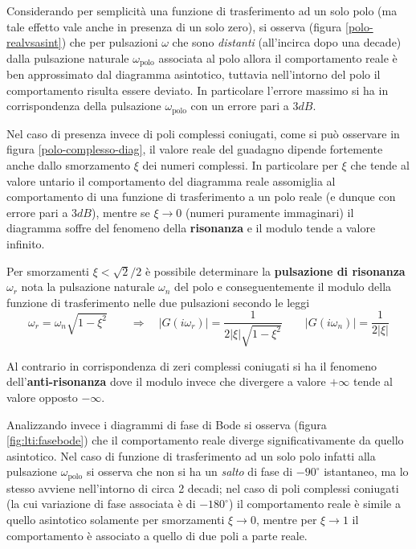 		Considerando per semplicità una funzione di trasferimento ad un solo polo (ma tale effetto vale anche in presenza di un solo zero), si osserva (figura \ref{polo-realvsasint}) che per pulsazioni $\omega$ che sono \textit{distanti} (all'incirca dopo una decade) dalla pulsazione naturale $\omega_\textrm{polo}$ associata al polo allora il comportamento reale è ben approssimato dal diagramma asintotico, tuttavia nell'intorno del polo il comportamento risulta essere deviato. In particolare l'errore massimo si ha in corrispondenza della pulsazione $\omega_\textrm{polo}$ con un errore pari a $3dB$.
		
		
		Nel caso di presenza invece di poli complessi coniugati, come si può osservare in figura \ref{polo-complesso-diag}, il valore reale del guadagno dipende fortemente anche dallo smorzamento $\xi$ dei numeri complessi. In particolare per $\xi$ che tende al valore untario il comportamento del diagramma reale assomiglia al comportamento di una funzione di trasferimento a un polo reale (e dunque con errore pari a $3dB$), mentre se $\xi \rightarrow 0$ (numeri puramente immaginari) il diagramma soffre del fenomeno della \textbf{risonanza} e il modulo tende a valore infinito.
			
		\begin{concetto}
			Per smorzamenti $\xi < \sqrt 2 / 2$ è possibile determinare la \textbf{pulsazione di risonanza} $\omega_r$ nota la pulsazione naturale $\omega_n$ del polo e conseguentemente il modulo della funzione di trasferimento nelle due pulsazioni secondo le leggi
			\begin{equation}
			\omega_r = \omega_n \sqrt{1-\xi^2} \qquad \Rightarrow \quad |G(i\omega_r)| = \frac 1 {2|\xi| \sqrt{1-\xi^2}} \qquad |G(i\omega_n)| = \frac 1 {2|\xi|}
			\end{equation}
		\end{concetto}
		Al contrario in corrispondenza di zeri complessi coniugati si ha il fenomeno dell'\textbf{anti-risonanza} dove il modulo invece che divergere a valore $+\infty$ tende al valore opposto $-\infty$.
		
		\vspace{3mm}
		Analizzando invece i diagrammi di fase di Bode si osserva (figura \ref{fig:lti:fasebode}) che il comportamento reale diverge significativamente da quello asintotico. Nel caso di funzione di trasferimento ad un solo polo infatti alla pulsazione $\omega_\textrm{polo}$ si osserva che non si ha un \textit{salto} di fase di $-90^\circ$ istantaneo, ma lo stesso avviene nell'intorno di circa 2 decadi; nel caso di poli complessi coniugati (la cui variazione di fase associata è di $-180^\circ$) il comportamento reale è simile a quello asintotico solamente per smorzamenti $\xi \rightarrow 0$, mentre per $\xi \rightarrow 1$ il comportamento è associato a quello di due poli a parte reale.
		
